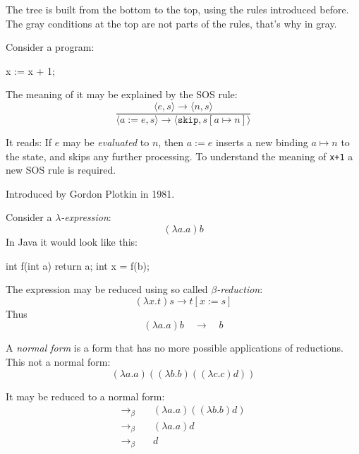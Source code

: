 \documentclass{article}
\begin{document}
The tree is built from the bottom to the top, using the rules introduced before.
The gray conditions at the top are not parts of the rules, that's why in gray.
\plush{}


Consider a program:
\begin{ffcode}
x := x + 1;
\end{ffcode}
The meaning of it may be explained by the SOS rule:
\begin{equation*}
\frac
  {\langle e, s \rangle \longrightarrow \langle n, s \rangle }
  {\langle a\;\texttt{:=}\;e, s \rangle \longrightarrow \langle \texttt{skip}, s[a \mapsto n] \rangle }
\end{equation*}

It reads: If \(e\) may be \emph{evaluated} to \(n\),
then \(a\;\texttt{:=}\;e\) inserts a new binding \(a \mapsto n\) to the state,
and skips any further processing. To understand the meaning of \texttt{x+1} a new SOS
rule is required.

Introduced by Gordon Plotkin in 1981.

\plush{}


Consider a \emph{$\lambda$-expression}:
\begin{equation*}
(\lambda a.a) b
\end{equation*}
In Java it would look like this:
\begin{ffcode}
int f(int a) { return a; }
int x = f(b);
\end{ffcode}

The expression may be reduced using so called \emph{$\beta$-reduction}:
\begin{equation*}
(\lambda x.t) s \longrightarrow t[x:=s]
\end{equation*}
Thus
\begin{equation*}
(\lambda a.a) b \quad\longrightarrow\quad b
\end{equation*}

\plush{}


A \emph{normal form} is a form that has no more possible applications of reductions.
This not a normal form:
\begin{equation*}
(\lambda a.a) ((\lambda b.b) ((\lambda c.c) d))
\end{equation*}

It may be reduced to a normal form:
\begin{equation*}
\begin{split}
\longrightarrow_\beta\quad & (\lambda a.a) ((\lambda b.b) d) \\
\longrightarrow_\beta\quad & (\lambda a.a) d \\
\longrightarrow_\beta\quad & d \\
\end{split}
\end{equation*}
\end{document}
